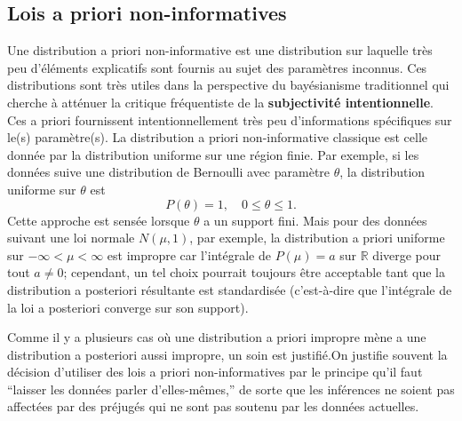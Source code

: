 \subsection{Lois a priori non-informatives}
 Une distribution a priori non-informative est une distribution sur laquelle tr\`es peu d'éléments explicatifs sont fournis au sujet des paramètres inconnus.
Ces distributions sont très utiles dans la perspective du bayésianisme traditionnel qui cherche à atténuer la critique fréquentiste de la \textbf{subjectivité intentionnelle}. Ces a priori fournissent intentionnellement très peu d'informations spécifiques sur le(s) paramètre(s).  \newpage\noindent La distribution a priori non-informative classique est celle donn\'ee par la distribution uniforme sur une r\'egion finie. Par exemple, si les données suive une distribution de Bernoulli avec param\`etre $\theta$, la distribution uniforme sur $\theta$ est 
$$ P(\theta) = 1,\quad  0\leq\theta\leq 1.$$  Cette approche est sens\'ee lorsque $\theta$ a un support fini. Mais pour des données suivant une loi normale $N (\mu, 1)$, par exemple, la distribution a priori uniforme sur $-\infty<\mu<\infty$ est impropre car l'int\'egrale de $P(\mu)=a$ sur $\mathbb{R}$ diverge pour tout $a\neq 0$; cependant, un tel choix pourrait toujours être acceptable tant que la distribution a posteriori résultante est standardisée (c'est-à-dire que l'intégrale de la loi a posteriori converge sur son support). \par Comme il y a plusieurs cas où une distribution a priori impropre m\`ene a une distribution a posteriori aussi impropre, un soin est justifié.\newl   On justifie souvent la d\'ecision d’utiliser des lois a priori non-informatives par le principe qu'il faut  ``laisser les données parler d’elles-mêmes,'' de sorte que les inférences ne soient pas affectées par des pr\'ejug\'es qui ne sont pas soutenu par les données actuelles.

